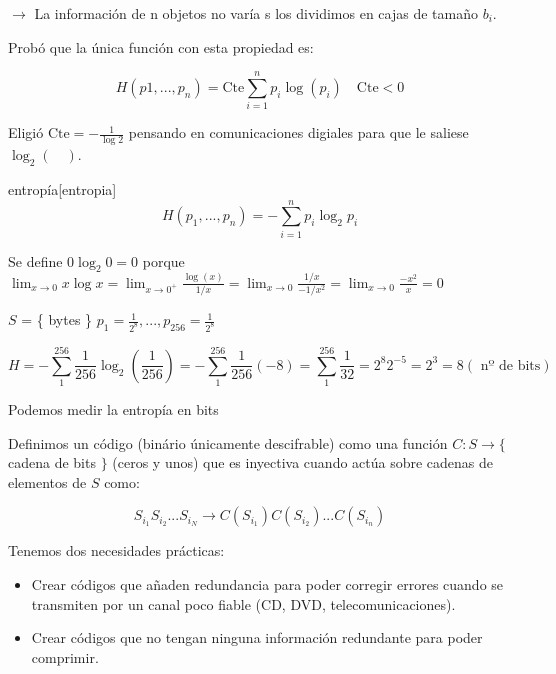 	$\rightarrow$ La información de n objetos no varía s los dividimos en cajas de tamaño $b_i$.

	Probó que la única función con esta propiedad es:

	$$H(p1, ..., p_n) = \text{Cte} \sum^{n}_{i=1} p_i \log(p_i) \quad \text{Cte} < 0 $$

	Eligió $\text{Cte} = -\frac{1}{\log 2}$ pensando en comunicaciones digiales para que le saliese $\log_2 ( \quad) $.

	\begin{defn}{entropía}[entropia]
		$$H(p_1, ..., p_n) = -\sum^{n}_{i = 1} p_i \log_2 p_i $$

		Se define $0 \log_2 0 = 0$ porque $\lim_{x \rightarrow 0} x \log x = \lim_{x \rightarrow 0^+} \frac{\log(x)}{1/x} = \lim_{x \rightarrow 0} \frac{1/x}{-1 / x^2} = \lim_{x \rightarrow 0} \frac{-x^2}{x} = 0$
	\end{defn}

	\begin{example}

		$S$ = \{ bytes \}  $p_1 = \frac{1}{2^8}, ..., p_{256} = \frac{1}{2^8}$

		$$  H = - \sum_{1}^{256} \frac{1}{256} \log_2 (\frac{1}{256}) = - \sum_{1}^{256} \frac{1}{256} (-8) = \sum_{1}^{256} \frac{1}{32} = 2^8 2^{-5} = 2^3 = 8 (\text{ nº de bits}) $$

	\end{example}

	\begin{obs}
		Podemos medir la entropía en bits
	\end{obs}



	\begin{defn}[código]
		Definimos un código (binário únicamente descifrable) como una función $C: S \rightarrow \{ $ cadena de bits $ \} $ (ceros y unos) que es inyectiva cuando actúa sobre cadenas de elementos de $S$ como:

		$$ S_{i_1} S_{i_2} ... S_{i_N} \rightarrow C(S_{i_1}) C(S_{i_2}) ... C(S_{i_n}) $$

	\end{defn}

	Tenemos dos necesidades prácticas:

	\begin{itemize}
		\item Crear códigos que añaden redundancia para poder corregir errores cuando se transmiten por un canal poco fiable (CD, DVD, telecomunicaciones).

		\item Crear códigos que no tengan ninguna información redundante para poder comprimir.
	\end{itemize}

